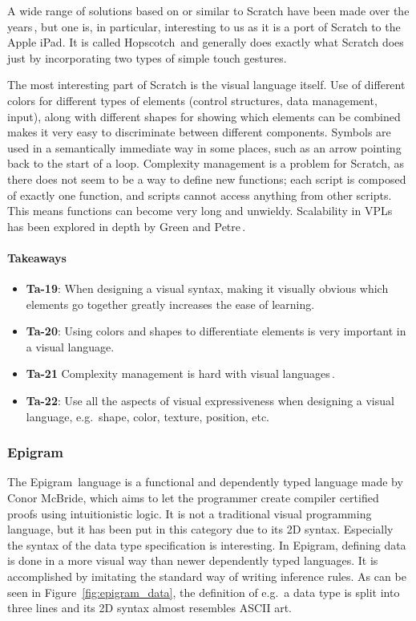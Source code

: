 A wide range of solutions based on or similar to Scratch have been made over the years\,\cite{hosick2014}, but one is, in particular, interesting to us as it is a port of Scratch to the Apple iPad. It is called Hopscotch\,\cite{hopscotch} and generally does exactly what Scratch does just by incorporating two types of simple touch gestures.

The most interesting part of Scratch is the visual language itself.
Use of different colors for different types of elements (control structures, data management, input), along with different shapes for showing which elements can be combined makes it very easy to discriminate between different components.
Symbols are used in a semantically immediate way in some places, such as an arrow pointing back to the start of a loop. 
Complexity management is a problem for Scratch, as there does not seem to be a way to define new functions; each script is composed of exactly one function, and scripts cannot access anything from other scripts.
This means functions can become very long and unwieldy.
Scalability in VPLs has been explored in depth by Green and Petre\,\cite{green1992visual}.

\paragraph{Takeaways}
\begin{itemize}
	\item \textbf{Ta-19}: When designing a visual syntax, making it visually obvious which elements go together greatly increases the ease of learning.
	\item \textbf{Ta-20}: Using colors and shapes to differentiate elements is very important in a visual language.
	\item \textbf{Ta-21} Complexity management is hard with visual languages\,\cite{green1992visual}.
	\item \textbf{Ta-22}: Use all the aspects of visual expressiveness when designing a visual language, e.g.\ shape, color, texture, position, etc.
\end{itemize}

\subsubsection{Epigram}
\label{subsub:Epigram}
The Epigram\,\cite{mcbride2005epigram} language is a functional and dependently typed language made by Conor McBride, which aims to let the programmer create compiler certified proofs using intuitionistic logic.
It is not a traditional visual programming language, but it has been put in this category due to its 2D syntax.
Especially the syntax of the data type specification is interesting.
In Epigram, defining data is done in a more visual way than newer dependently typed languages. 
It is accomplished by imitating the standard way of writing inference rules.
As can be seen in Figure~\ref{fig:epigram_data}, the definition of e.g.\ a data type is split into three lines and its 2D syntax almost resembles ASCII art. 

